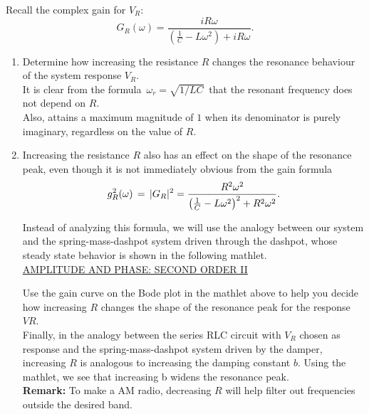 Recall the complex gain for $V _R$:
\begin{equation*}
  \displaystyle  G_ R(\omega )
  \displaystyle =
  \displaystyle \frac{iR\omega }{\left(\frac{1}{C}-L\omega ^2\right)+iR\omega }.
\end{equation*}
\begin{enumerate}
\item Determine how increasing the resistance $R$ changes
  the resonance behaviour of the system response $V _R$. \\

  It is clear from the formula $\, \omega _ r=\sqrt {1/LC}\,$
  that the resonant frequency does not depend on $R$. \\
  Also, attains a maximum magnitude of $1$ when its denominator is purely imaginary, regardless on the value of $R$.

\item Increasing the resistance $R$ also has an effect on the shape of the resonance peak,
  even though it is not immediately obvious from the gain formula
  \begin{equation*}
    \displaystyle  \displaystyle g_ R^2(\omega )\, =\, |G_ R|^2
    \displaystyle =
    \displaystyle  \frac{R^2\omega ^2}{\left(\frac{1}{C}-L\omega ^2\right)^2+R^2\omega ^2}.
  \end{equation*}

  Instead of analyzing this formula, we will use the analogy between our system and the spring-mass-dashpot system driven through the dashpot,
  whose steady state behavior is shown in the following mathlet.\\
  \href{http://mathlets.org/mathlets/amplitude-and-phase-2nd-order-ii/}
  {AMPLITUDE AND PHASE: SECOND ORDER II}

  Use the gain curve on the Bode plot in the mathlet above to help you decide how increasing $R$
  changes the shape of the resonance peak for the response $VR$.\\

  Finally, in the analogy between the series RLC circuit with $V_R$
  chosen as response and the spring-mass-dashpot system driven by the damper,
  increasing $R$ is analogous to increasing the damping constant $b$.
  Using the mathlet, we see that increasing b widens the resonance peak.\\
  \textbf{Remark:} To make a AM radio, decreasing $R$ will help filter out frequencies outside the desired band.  
\end{enumerate}
\clearpage

